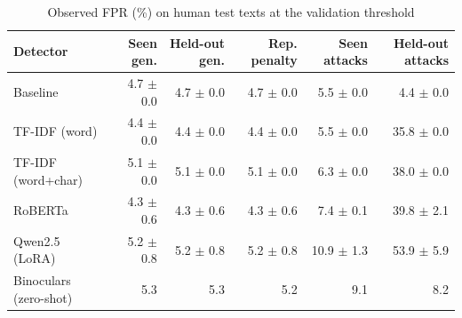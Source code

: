 \begin{table}[!t]
\centering
\caption{Observed FPR (\%) on human test texts at the validation threshold}
\label{tab:main_fpr}
\footnotesize
\begin{tabular}{lrrrrr}
\toprule
\textbf{Detector} & \textbf{Seen gen.} & \textbf{Held-out gen.} & \textbf{Rep. penalty} & \textbf{Seen attacks} & \textbf{Held-out attacks} \\
\midrule
Baseline & 4.7 $\pm$ 0.0 & 4.7 $\pm$ 0.0 & 4.7 $\pm$ 0.0 & 5.5 $\pm$ 0.0 & 4.4 $\pm$ 0.0 \\
TF-IDF (word) & 4.4 $\pm$ 0.0 & 4.4 $\pm$ 0.0 & 4.4 $\pm$ 0.0 & 5.5 $\pm$ 0.0 & 35.8 $\pm$ 0.0 \\
TF-IDF (word+char) & 5.1 $\pm$ 0.0 & 5.1 $\pm$ 0.0 & 5.1 $\pm$ 0.0 & 6.3 $\pm$ 0.0 & 38.0 $\pm$ 0.0 \\
RoBERTa & 4.3 $\pm$ 0.6 & 4.3 $\pm$ 0.6 & 4.3 $\pm$ 0.6 & 7.4 $\pm$ 0.1 & 39.8 $\pm$ 2.1 \\
Qwen2.5 (LoRA) & 5.2 $\pm$ 0.8 & 5.2 $\pm$ 0.8 & 5.2 $\pm$ 0.8 & 10.9 $\pm$ 1.3 & 53.9 $\pm$ 5.9 \\
Binoculars (zero-shot) & 5.3 & 5.3 & 5.2 & 9.1 & 8.2 \\
\bottomrule
\end{tabular}
\end{table}
